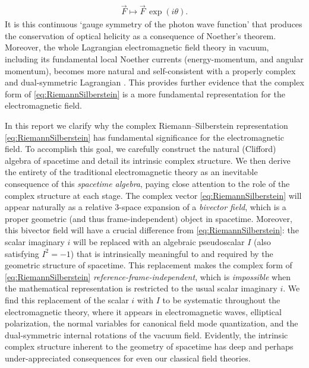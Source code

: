 \documentclass[1p,sort&compress]{elsarticle}
\numberwithin{equation}{section}
\newcommand{\rv}[1]{\vec{#1}}
\begin{document}
\begin{align}
  \rv{F} \mapsto \rv{F}\,\exp(i\theta).
\end{align}
It is this continuous `gauge symmetry of the photon wave function' that produces the conservation of optical helicity as a consequence of Noether's theorem. Moreover, the whole Lagrangian electromagnetic field theory in vacuum, including its fundamental local Noether currents (energy-momentum, and angular momentum), becomes more natural and self-consistent with a properly complex and dual-symmetric Lagrangian \cite{Bliokh2013}. This provides further evidence that the complex form of \eqref{eq:RiemannSilberstein} is a more fundamental representation for the electromagnetic field.  

In this report we clarify why the complex Riemann--Silberstein representation \eqref{eq:RiemannSilberstein} has fundamental significance for the electromagnetic field.  To accomplish this goal, we carefully construct the natural (Clifford) algebra of spacetime \cite{Hestenes1966} and detail its intrinsic complex structure.  We then derive the entirety of the traditional electromagnetic theory as an inevitable consequence of this \emph{spacetime algebra}, paying close attention to the role of the complex structure at each stage.  The complex vector \eqref{eq:RiemannSilberstein} will appear naturally as a relative 3-space expansion of a \emph{bivector field}, which is a proper geometric (and thus frame-independent) object in spacetime.  Moreover, this bivector field will have a crucial difference from \eqref{eq:RiemannSilberstein}: the scalar imaginary $i$ will be replaced with an algebraic pseudoscalar $I$ (also satisfying $I^2 = -1$) that is intrinsically meaningful to and required by the geometric structure of spacetime.  This replacement makes the complex form of \eqref{eq:RiemannSilberstein} \emph{reference-frame-independent}, which is \emph{impossible} when the mathematical representation is restricted to the usual scalar imaginary $i$.  We find this replacement of the scalar $i$ with $I$ to be systematic throughout the electromagnetic theory, where it appears in electromagnetic waves, elliptical polarization, the normal variables for canonical field mode quantization, and the dual-symmetric internal rotations of the vacuum field.  Evidently, the intrinsic complex structure inherent to the geometry of spacetime has deep and perhaps under-appreciated consequences for even our classical field theories.
\end{document}
